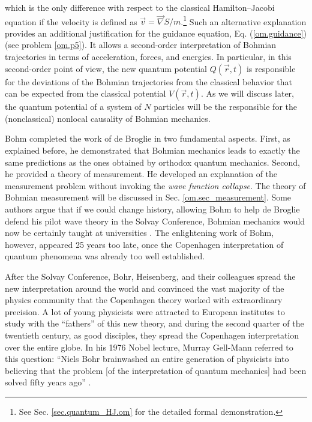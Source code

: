 \documentclass[nofootinbib, secnumarabic, amsmath, nobibnotes,10pt,aps,pra]{revtex4-1}
\newcommand{\sref}[1]{Sec. \ref{#1}}
\newcommand{\eref}[1]{Eq. (\ref{#1})}
\begin{document}
which is the only difference with respect to the classical
Hamilton--Jacobi equation if the velocity is defined as $\vec{v} =
\vec{\nabla}S / m$.\footnote{See \sref{sec.quantum_HJ.om} for the
detailed formal demonstration.} Such an alternative explanation
provides an additional justification for the guidance equation,
\eref{om.guidance} (see problem \ref{om.p5}). It allows a
second-order interpretation of Bohmian trajectories in terms of
acceleration, forces, and energies. In particular, in this
second-order point of view, the new quantum potential $Q(\vec{r},t)$
is responsible for the deviations of the Bohmian trajectories from
the classical behavior that can be expected from the classical
potential $V(\vec{r},t)$. As we will discuss later, the quantum
potential of a system of $N$ particles will be the responsible for
the (nonclassical) nonlocal causality of Bohmian mechanics.

Bohm completed the work of de Broglie in two fundamental aspects. First, as explained before, he demonstrated that Bohmian mechanics leads to exactly the same predictions as the ones obtained by orthodox quantum mechanics. Second, he provided a theory of measurement. He developed an explanation of the measurement problem without invoking the \textit{wave function collapse}. The theory of Bohmian measurement will be discussed in \sref{om.sec_measurement}. Some authors argue that if we could change history, allowing Bohm to help de Broglie defend his pilot wave theory in the Solvay Conference, Bohmian mechanics would now be certainly taught at universities \cite{om.nikolic2008a}. The enlightening work of Bohm, however, appeared 25 years too late, once the Copenhagen interpretation of quantum phenomena was already too well established.

After the Solvay Conference, Bohr, Heisenberg, and their colleagues
spread the new interpretation around the world and convinced the
vast majority of the physics community that the Copenhagen theory worked with extraordinary precision. A lot of
young physicists were attracted to European institutes to study with
the ``fathers'' of this new theory, and during the second quarter of
the twentieth century, as good disciples, they spread the Copenhagen
interpretation over the entire globe. In his 1976 Nobel lecture,
Murray Gell-Mann referred to this question: ``Niels Bohr brainwashed
an entire generation of physicists into believing that the problem
[of the interpretation of quantum mechanics] had been solved fifty
years ago'' \cite{om.hard}.
\end{document}
